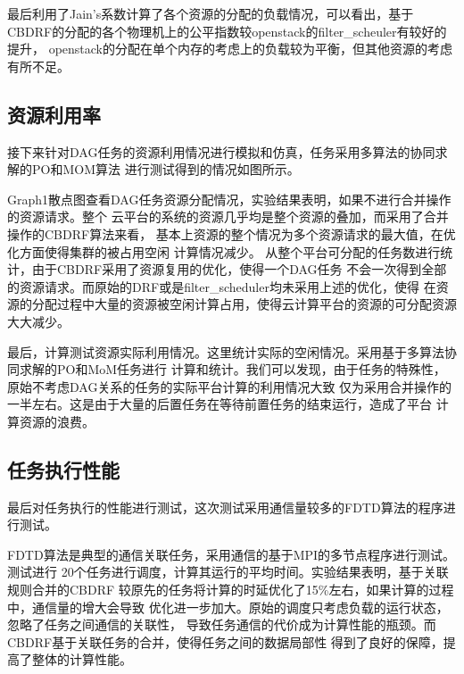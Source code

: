 最后利用了Jain's系数计算了各个资源的分配的负载情况，可以看出，基于
CBDRF的分配的各个物理机上的公平指数较openstack的filter\_scheuler有较好的提升，
openstack的分配在单个内存的考虑上的负载较为平衡，但其他资源的考虑有所不足。

\subsection{资源利用率}
接下来针对DAG任务的资源利用情况进行模拟和仿真，任务采用多算法的协同求解的PO和MOM算法
进行测试得到的情况如图所示。

Graph1散点图查看DAG任务资源分配情况，实验结果表明，如果不进行合并操作的资源请求。整个
云平台的系统的资源几乎均是整个资源的叠加，而采用了合并操作的CBDRF算法来看，
基本上资源的整个情况为多个资源请求的最大值，在优化方面使得集群的被占用空闲
计算情况减少。
从整个平台可分配的任务数进行统计，由于CBDRF采用了资源复用的优化，使得一个DAG任务
不会一次得到全部的资源请求。而原始的DRF或是filter\_scheduler均未采用上述的优化，使得
在资源的分配过程中大量的资源被空闲计算占用，使得云计算平台的资源的可分配资源大大减少。

最后，计算测试资源实际利用情况。这里统计实际的空闲情况。采用基于多算法协同求解的PO和MoM任务进行
计算和统计。我们可以发现，由于任务的特殊性，原始不考虑DAG关系的任务的实际平台计算的利用情况大致
仅为采用合并操作的一半左右。这是由于大量的后置任务在等待前置任务的结束运行，造成了平台
计算资源的浪费。

\subsection{任务执行性能}
最后对任务执行的性能进行测试，这次测试采用通信量较多的FDTD算法的程序进行测试。

FDTD算法是典型的通信关联任务，采用通信的基于MPI的多节点程序进行测试。测试进行
20个任务进行调度，计算其运行的平均时间。实验结果表明，基于关联规则合并的CBDRF
较原先的任务将计算的时延优化了15\%左右，如果计算的过程中，通信量的增大会导致
优化进一步加大。原始的调度只考虑负载的运行状态，忽略了任务之间通信的关联性，
导致任务通信的代价成为计算性能的瓶颈。而CBDRF基于关联任务的合并，使得任务之间的数据局部性
得到了良好的保障，提高了整体的计算性能。

